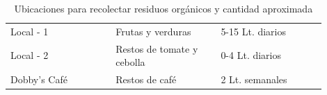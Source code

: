 \begin{table}[H]
\caption{Ubicaciones para recolectar residuos orgánicos y cantidad aproximada}
\label{tab:ubicaciones_para_contenedores}
{\small{}
\begin{tabular}{M{0.3\linewidth}M{0.3\linewidth}M{0.3\linewidth}}\hline
    
     &  &  \\ \hline

    Local - 1  & Frutas y verduras & 5-15 Lt. diarios \\
    Local - 2 & Restos de tomate y cebolla & 0-4 Lt. diarios \\
    Dobby’s Café & Restos de café  & 2 Lt. semanales \\

    \hline
\end{tabular}}
\end{table}

